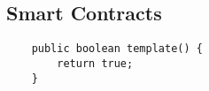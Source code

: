 
\begin{appendix}

\section{Smart Contracts \label{annex:SmartContracts}}

\begin{lstlisting}
    public boolean template() {
        return true;
    }

\end{lstlisting}



\end{appendix}

\endinput
